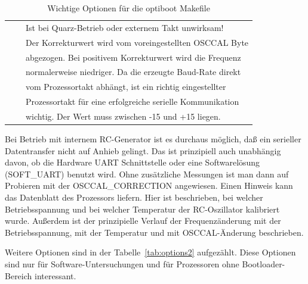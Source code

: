 \begin{table}[H]
\begin{center}
\begin{tabular}{| c | c | l |}
                   &                & Ist bei Quarz-Betrieb oder externem Takt unwirksam! \\
                   &                & Der Korrekturwert wird vom voreingestellten OSCCAL Byte \\
                   &                & abgezogen. Bei positivem Korrekturwert wird die Frequenz \\
                   &                & normalerweise niedriger. Da die erzeugte Baud-Rate direkt \\
                   &                & vom Prozessortakt abhängt, ist ein richtig eingestellter \\
                   &                & Prozessortakt für eine erfolgreiche serielle Kommunikation \\
                   &                & wichtig. Der Wert muss zwischen -15 und +15 liegen. \\
    \hline
    \end{tabular}
  \end{center}
  \caption{Wichtige Optionen für die optiboot Makefile}
  \label{tab:options1}
\end{table}

Bei Betrieb mit internem RC-Generator ist es durchaus möglich, daß ein serieller Datentransfer
nicht auf Anhieb gelingt. Das ist prinzipiell auch unabhängig davon, ob die Hardware UART
Schnittstelle oder eine Softwarelösung (SOFT\_UART) benutzt wird. Ohne zusätzliche Messungen
ist man dann auf Probieren mit der OSCCAL\_CORRECTION angewiesen. Einen Hinweis kann
das Datenblatt des Prozessors liefern. Hier ist beschrieben, bei welcher Betriebsspannung
und bei welcher Temperatur der RC-Oszillator kalibriert wurde. Außerdem ist der
prinzipielle Verlauf der Frequenzänderung mit der Betriebsspannung, mit der Temperatur und
mit OSCCAL-Änderung beschrieben. 


Weitere Optionen sind in der Tabelle~\ref{tab:options2} aufgezählt. 
Diese Optionen sind nur für Software-Untersuchungen und für
Prozessoren ohne Bootloader-Bereich interessant.

